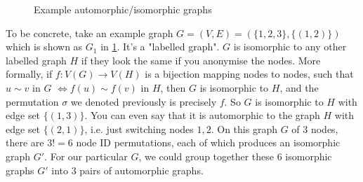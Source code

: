 \begin{figure}
    \caption{Example automorphic/isomorphic graphs}
    \label{fig:automorphic_isomorphic_graphs}
\end{figure}

To be concrete, take an example graph $G = (V, E) = (\{1, 2, 3\}, \{(1,2)\})$ which is shown as $G_1$ in \cref{fig:automorphic_isomorphic_graphs}. It's a "labelled graph". $G$ is isomorphic to any other labelled graph $H$ if they look the same if you anonymise the nodes.
More formally, if $f: V(G) \to V(H)$ is a bijection mapping nodes to nodes, such that $u \sim v$ in $G$ $\iff f(u) \sim f(v)$ in $H$, then $G$ is isomorphic to $H$, and the permutation $\sigma$ we denoted previously is precisely $f$. So $G$ is isomorphic to $H$ with edge set $\{(1, 3)\}$. You can even say that it is automorphic to the graph $H$ with edge set $\{(2, 1)\}$, i.e. just switching nodes $1,2$.
On this graph $G$ of 3 nodes, there are $3! = 6$ node ID permutations, each of which produces an isomorphic graph $G'$. For our particular $G$, we could group together these 6 isomorphic graphs $G'$ into 3 pairs of automorphic graphs.

